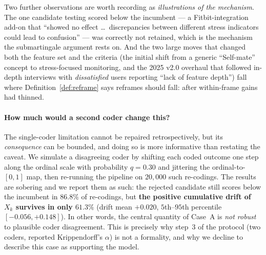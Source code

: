 \documentclass[11pt]{article}
\begin{document}
Two further observations are worth recording as \emph{illustrations of the mechanism}. The one candidate testing scored below the incumbent --- a Fitbit-integration add-on that ``showed no effect \ldots\ discrepancies between different stress indicators could lead to confusion'' --- was correctly not retained, which is the mechanism the submartingale argument rests on. And the two large moves that changed both the feature set and the criteria (the initial shift from a generic ``Self-mate'' concept to stress-focused monitoring, and the 2025 v2.0 overhaul that followed in-depth interviews with \emph{dissatisfied} users reporting ``lack of feature depth'') fall where Definition~\ref{def:reframe} says reframes should fall: after within-frame gains had thinned.

\paragraph{How much would a second coder change this?} The single-coder limitation cannot be repaired retrospectively, but its \emph{consequence} can be bounded, and doing so is more informative than restating the caveat. We simulate a disagreeing coder by shifting each coded outcome one step along the ordinal scale with probability $q=0.30$ and jittering the ordinal-to-$[0,1]$ map, then re-running the pipeline on $20{,}000$ such re-codings. The results are sobering and we report them as such: the rejected candidate still scores below the incumbent in $86.8\%$ of re-codings, but \textbf{the positive cumulative drift of $X_k$ survives in only $61.3\%$} (drift mean $+0.020$, $5$th--$95$th percentile $[-0.056,+0.148]$). In other words, the central quantity of Case~A is \emph{not robust} to plausible coder disagreement. This is precisely why step~3 of the protocol (two coders, reported Krippendorff's $\alpha$) is not a formality, and why we decline to describe this case as supporting the model.
\end{document}
